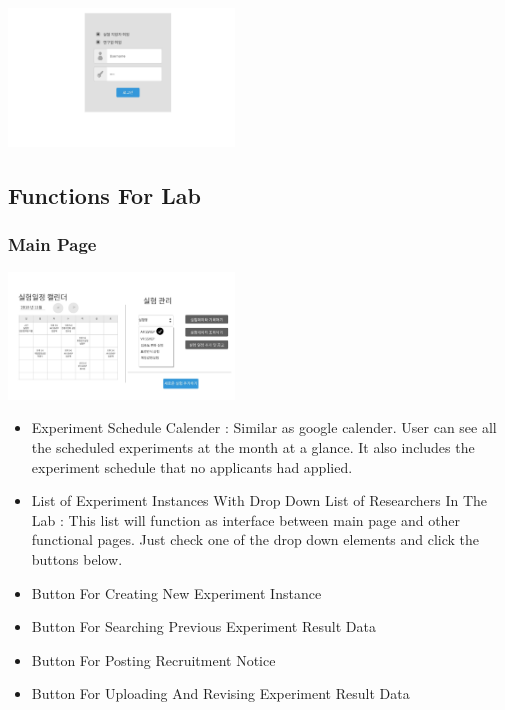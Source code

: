 \documentclass[letterpaper, 10 pt, conference]{ieeeconf}  %
\begin{document}
\includegraphics[width=6cm]{02_signin}



\subsection{Functions For Lab}

\subsubsection{Main Page\\}

\includegraphics[width=6cm]{Oven/06-labMainpage.jpg}
\begin{itemize}
\item Experiment Schedule Calender : Similar as google calender. User can see all the scheduled experiments at the month at a glance. It also includes the experiment schedule that no applicants had applied. 
\item List of Experiment Instances With Drop Down List of Researchers In The Lab : This list will function as interface between main page and other functional pages. Just check one of the drop down elements and click the buttons below. 
\item Button For Creating New Experiment Instance
\item Button For Searching Previous Experiment Result Data
\item Button For Posting Recruitment Notice
\item Button For Uploading And Revising Experiment Result Data

\end{itemize}
\end{document}
